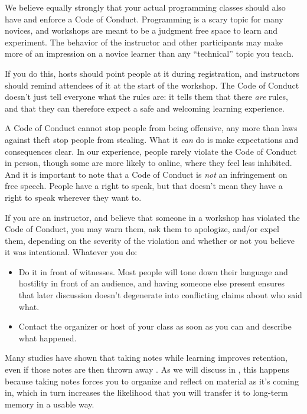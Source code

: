 We believe equally strongly that your actual programming classes
should also have and enforce a Code of Conduct.  Programming is a
scary topic for many novices, and workshops are meant to be a judgment
free space to learn and experiment. The behavior of the instructor and
other participants may make more of an impression on a novice learner
than any ``technical'' topic you teach.

If you do this, hosts should point people at it during registration,
and instructors should remind attendees of it at the start of the
workshop. The Code of Conduct doesn't just tell everyone what the
rules are: it tells them that there \emph{are} rules, and that they
can therefore expect a safe and welcoming learning experience.

A Code of Conduct cannot stop people from being offensive, any more
than laws against theft stop people from stealing. What it \emph{can}
do is make expectations and consequences clear.  In our experience,
people rarely violate the Code of Conduct in person, though some are
more likely to online, where they feel less inhibited.  And it is
important to note that a Code of Conduct is \emph{not} an infringement
on free speech.  People have a right to speak, but that doesn't mean
they have a right to speak wherever they want to.

If you are an instructor, and believe that someone in a workshop has
violated the Code of Conduct, you may warn them, ask them to
apologize, and/or expel them, depending on the severity of the
violation and whether or not you believe it was intentional.  Whatever
you do:

\begin{itemize}

\item
  Do it in front of witnesses.  Most people will tone down their
  language and hostility in front of an audience, and having someone
  else present ensures that later discussion doesn't degenerate into
  conflicting claims about who said what.

\item
  Contact the organizer or host of your class as soon as you can and
  describe what happened.

\end{itemize}


Many studies have shown that taking notes while learning improves
retention, even if those notes are then thrown away \cite{fixme}.  As
we will discuss in , this happens because taking
notes forces you to organize and reflect on material as it's coming
in, which in turn increases the likelihood that you will transfer it
to long-term memory in a usable way.

